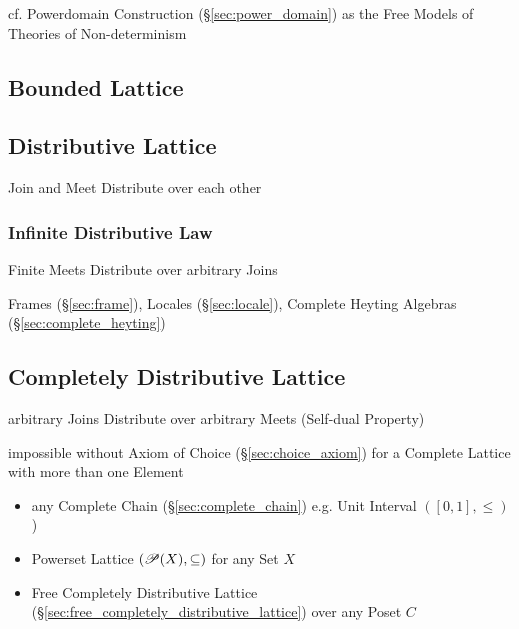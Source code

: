 cf. Powerdomain Construction (\S\ref{sec:power_domain}) as the Free
Models of Theories of Non-determinism



\subsection{Bounded Lattice}\label{sec:bounded_lattice}

\subsection{Distributive Lattice}\label{sec:distributive_lattice}

Join and Meet Distribute over each other



\subsubsection{Infinite Distributive Law}
\label{sec:infinite_distributive}

Finite Meets Distribute over arbitrary Joins

Frames (\S\ref{sec:frame}), Locales (\S\ref{sec:locale}), Complete
Heyting Algebras (\S\ref{sec:complete_heyting})



\subsection{Completely Distributive Lattice}
\label{sec:completely_distributive}

arbitrary Joins Distribute over arbitrary Meets (Self-dual Property)

impossible without Axiom of Choice (\S\ref{sec:choice_axiom}) for a
Complete Lattice with more than one Element

\begin{itemize}
  \item any Complete Chain (\S\ref{sec:complete_chain}) e.g. Unit
    Interval $([0,1], \leq)$)
  \item Powerset Lattice $(\mathscr{P}(X), \subseteq)$ for any Set
    $X$
  \item Free Completely Distributive Lattice
    (\S\ref{sec:free_completely_distributive_lattice}) over any Poset
    $C$
\end{itemize}




